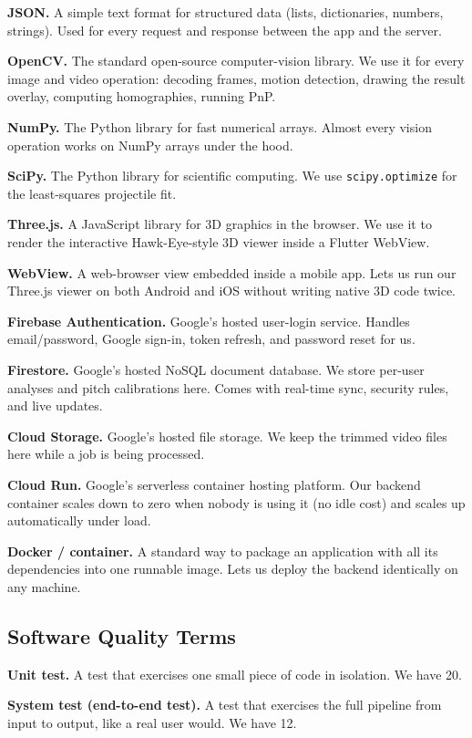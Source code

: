 \documentclass[11pt,a4paper]{article}
\begin{document}
\textbf{JSON.} A simple text format for structured data (lists, dictionaries, numbers, strings). Used for every request and response between the app and the server.

\textbf{OpenCV.} The standard open-source computer-vision library. We use it for every image and video operation: decoding frames, motion detection, drawing the result overlay, computing homographies, running PnP.

\textbf{NumPy.} The Python library for fast numerical arrays. Almost every vision operation works on NumPy arrays under the hood.

\textbf{SciPy.} The Python library for scientific computing. We use \texttt{scipy.optimize} for the least-squares projectile fit.

\textbf{Three.js.} A JavaScript library for 3D graphics in the browser. We use it to render the interactive Hawk-Eye-style 3D viewer inside a Flutter WebView.

\textbf{WebView.} A web-browser view embedded inside a mobile app. Lets us run our Three.js viewer on both Android and iOS without writing native 3D code twice.

\textbf{Firebase Authentication.} Google's hosted user-login service. Handles email/password, Google sign-in, token refresh, and password reset for us.

\textbf{Firestore.} Google's hosted NoSQL document database. We store per-user analyses and pitch calibrations here. Comes with real-time sync, security rules, and live updates.

\textbf{Cloud Storage.} Google's hosted file storage. We keep the trimmed video files here while a job is being processed.

\textbf{Cloud Run.} Google's serverless container hosting platform. Our backend container scales down to zero when nobody is using it (no idle cost) and scales up automatically under load.

\textbf{Docker / container.} A standard way to package an application with all its dependencies into one runnable image. Lets us deploy the backend identically on any machine.

\subsection{Software Quality Terms}

\textbf{Unit test.} A test that exercises one small piece of code in isolation. We have 20.

\textbf{System test (end-to-end test).} A test that exercises the full pipeline from input to output, like a real user would. We have 12.
\end{document}
